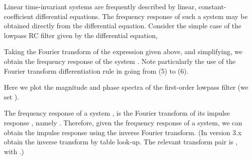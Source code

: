 \documentclass{article}
\begin{document}
\begin{CellGroup}


Linear time-invariant systems are frequently described by linear, constant-coefficient differential equations. The frequency response of such a system
may be obtained directly from the differential equation. Consider the simple case of the lowpass RC filter given by the differential equation,


Taking the Fourier transform of the expression given above, and simplifying, we obtain the frequency response of the system . Note particularly the use of the Fourier transform differentiation rule in going from (5) to (6).



\inlineTFinmath{\ScriptCapitalF [a\multsp y'(t)]+\ScriptCapitalF [y(t)]=\ScriptCapitalF [x(t)]}



Here we plot the magnitude and phase spectra of the first-order lowpass filter (we set ).



\begin{CellGroup}

\end{CellGroup}
The frequency response of a system , is the Fourier transform of its impulse response , namely . Therefore, given the frequency response of a system, we can obtain the impulse response
using the inverse Fourier transform. (In version 3.x obtain the inverse transform by table look-up. The relevant transform pair is , with .)




\end{CellGroup}
\end{document}
